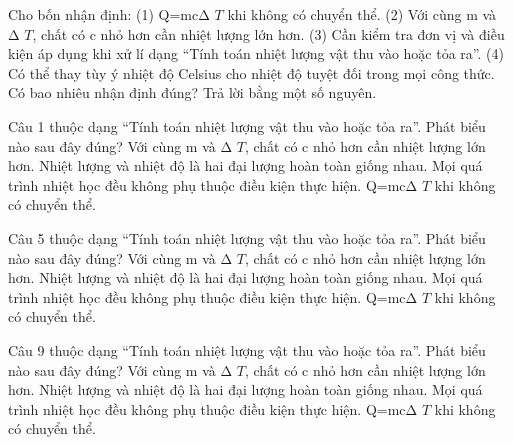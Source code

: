 \begin{ex}
Cho bốn nhận định: (1) Q=mcΔ $T$ khi không có chuyển thể. (2) Với cùng m và Δ $T$, chất có c nhỏ hơn cần nhiệt lượng lớn hơn. (3) Cần kiểm tra đơn vị và điều kiện áp dụng khi xử lí dạng “Tính toán nhiệt lượng vật thu vào hoặc tỏa ra”. (4) Có thể thay tùy ý nhiệt độ Celsius cho nhiệt độ tuyệt đối trong mọi công thức. Có bao nhiêu nhận định đúng? Trả lời bằng một số nguyên.
\end{ex}

\begin{ex}
Câu 1 thuộc dạng “Tính toán nhiệt lượng vật thu vào hoặc tỏa ra”. Phát biểu nào sau đây đúng?
\choice
{Với cùng m và Δ $T$, chất có c nhỏ hơn cần nhiệt lượng lớn hơn.}
{Nhiệt lượng và nhiệt độ là hai đại lượng hoàn toàn giống nhau.}
{Mọi quá trình nhiệt học đều không phụ thuộc điều kiện thực hiện.}
{\True Q=mcΔ $T$ khi không có chuyển thể.}
\end{ex}

\begin{ex}
Câu 5 thuộc dạng “Tính toán nhiệt lượng vật thu vào hoặc tỏa ra”. Phát biểu nào sau đây đúng?
\choice
{Với cùng m và Δ $T$, chất có c nhỏ hơn cần nhiệt lượng lớn hơn.}
{Nhiệt lượng và nhiệt độ là hai đại lượng hoàn toàn giống nhau.}
{Mọi quá trình nhiệt học đều không phụ thuộc điều kiện thực hiện.}
{\True Q=mcΔ $T$ khi không có chuyển thể.}
\end{ex}

\begin{ex}
Câu 9 thuộc dạng “Tính toán nhiệt lượng vật thu vào hoặc tỏa ra”. Phát biểu nào sau đây đúng?
\choice
{Với cùng m và Δ $T$, chất có c nhỏ hơn cần nhiệt lượng lớn hơn.}
{Nhiệt lượng và nhiệt độ là hai đại lượng hoàn toàn giống nhau.}
{Mọi quá trình nhiệt học đều không phụ thuộc điều kiện thực hiện.}
{\True Q=mcΔ $T$ khi không có chuyển thể.}
\end{ex}


